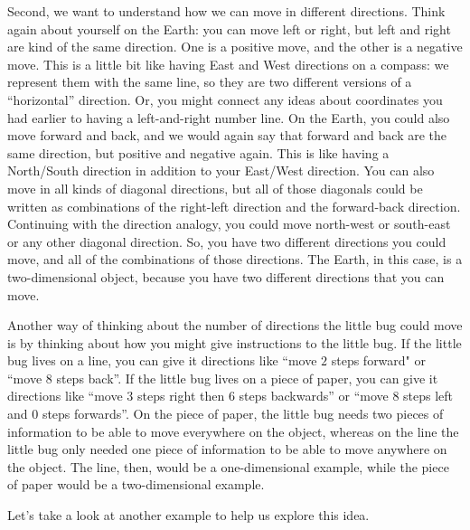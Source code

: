 \documentclass{ximera}
\begin{document}
Second, we want to understand how we can move in different directions. Think again about yourself on the Earth: you can move left or right, but left and right are kind of the same direction. One is a positive move, and the other is a negative move. This is a little bit like having East and West directions on a compass: we represent them with the same line, so they are two different versions of a ``horizontal'' direction. Or, you might connect any ideas about coordinates you had earlier to having a left-and-right number line. On the Earth, you could also move forward and back, and we would again say that forward and back are the same direction, but positive and negative again. This is like having a North/South direction in addition to your East/West direction. You can also move in all kinds of diagonal directions, but all of those diagonals could be written as combinations of the right-left direction and the forward-back direction. Continuing with the direction analogy, you could move north-west or south-east or any other diagonal direction. So, you have two different directions you could move, and all of the combinations of those directions. The Earth, in this case, is a two-dimensional object, because you have two different directions that you can move.

Another way of thinking about the number of directions the little bug could move is by thinking about how you might give instructions to the little bug. If the little bug lives on a line, you can give it directions like ``move $2$ steps forward" or ``move 8 steps back''. If the little bug lives on a piece of paper, you can give it directions like ``move $3$ steps right then $6$ steps backwards'' or ``move $8$ steps left and $0$ steps forwards''. On the piece of paper, the little bug needs two pieces of information to be able to move everywhere on the object, whereas on the line the little bug only needed one piece of information to be able to move anywhere on the object. The line, then, would be a one-dimensional example, while the piece of paper would be a two-dimensional example.


Let's take a look at another example to help us explore this idea.

\end{document}
